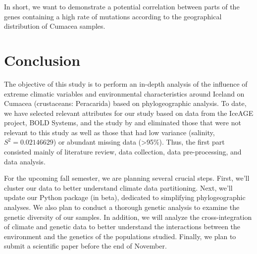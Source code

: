 In short, we want to demonstrate a potential correlation between parts of the genes containing a high rate of mutations according to the geographical distribution of Cumacea samples.

\section{Conclusion}\label{conclusion}

The objective of this study is to perform an in-depth analysis of the influence of extreme climatic variables and environmental characteristics around Iceland on Cumacea (crustaceans: Peracarida) based on phylogeographic analysis. To date, we have selected relevant attributes for our study based on data from the IceAGE project, BOLD Systems, and the study by \cite{uhlir_adding_2021} and eliminated those that were not relevant to this study as well as those that had low variance (salinity, \( S^2 = 0.02146629 \)) or abundant missing data (>95\%). Thus, the first part consisted mainly of literature review, data collection, data pre-processing, and data analysis.

For the upcoming fall semester, we are planning several crucial steps. First, we'll cluster our data to better understand climate data partitioning. Next, we'll update our Python package (in beta), dedicated to simplifying phylogeographic analyses. We also plan to conduct a thorough genetic analysis to examine the genetic diversity of our samples. In addition, we will analyze the cross-integration of climate and genetic data to better understand the interactions between the environment and the genetics of the populations studied. Finally, we plan to submit a scientific paper before the end of November.

